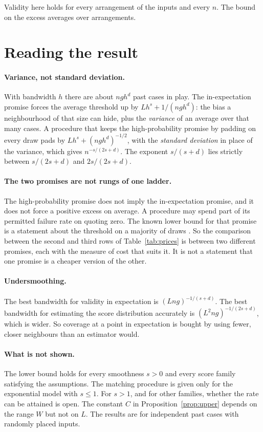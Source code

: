 \documentclass[11pt]{article}
\theoremstyle{definition}
\theoremstyle{remark}
\begin{document}
Validity here holds for every arrangement of the inputs and every $n$. The bound on the
excess averages over arrangements.

\section{Reading the result}\label{sec:reading}

\paragraph{Variance, not standard deviation.}
With bandwidth $h$ there are about $ngh^d$ past cases in play. The in-expectation promise
forces the average threshold up by $Lh^s+1/(ngh^d)$: the bias a neighbourhood of that size
can hide, plus the \emph{variance} of an average over that many cases. A procedure that
keeps the high-probability promise by padding on every draw pads by
$Lh^s+(ngh^d)^{-1/2}$, with the \emph{standard deviation} in place of the variance, which
gives $n^{-s/(2s+d)}$. The exponent $s/(s+d)$ lies strictly between $s/(2s+d)$ and
$2s/(2s+d)$.

\paragraph{The two promises are not rungs of one ladder.}
The high-probability promise does not imply the in-expectation promise, and it does not
force a positive excess on average. A procedure may spend part of its permitted failure
rate on quoting zero. The known lower bound for that promise is a statement about the
threshold on a majority of draws \citep{low1997nonparametric,cotton2026honest}. So the
comparison between the second and third rows of Table~\ref{tab:prices} is between two
different promises, each with the measure of cost that suits it. It is not a statement that
one promise is a cheaper version of the other.

\paragraph{Undersmoothing.}
The best bandwidth for validity in expectation is $(Lng)^{-1/(s+d)}$. The best bandwidth
for estimating the score distribution accurately is $(L^2ng)^{-1/(2s+d)}$, which is wider.
So coverage at a point in expectation is bought by using fewer, closer neighbours than an
estimator would.

\paragraph{What is not shown.}
The lower bound holds for every smoothness $s>0$ and every score family satisfying the
assumptions. The matching procedure is given only for the exponential model with $s\le1$.
For $s>1$, and for other families, whether the rate can be attained is open. The constant
$C$ in Proposition~\ref{prop:upper} depends on the range $W$ but not on $L$. The results are
for independent past cases with randomly placed inputs.
\end{document}
